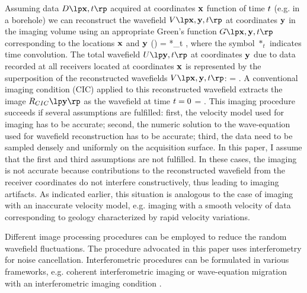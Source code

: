 Assuming data $\DD{\xm,\tm}$ acquired at coordinates ${\mathbf{x}}$ function of
time ${t}$ (e.g. in a borehole) we can reconstruct the wavefield
$\VV{\xm,\ym,\tm}$ at coordinates ${\mathbf{y}}$ in the imaging volume using an
appropriate Green's function $\GG{\xm,\ym,\tm}$ corresponding to the
locations ${\mathbf{x}}$ and ${\mathbf{y}}$ ()
%
\beq \label{eqn:green}
\VV{\xm,\ym,\tm} = \DD{\xm,\tm} *_t \GG{\xm,\ym,\tm} \;,
\eeq
%
where the symbol $*_t$ indicates time convolution.  The total
wavefield $\UU{\ym,\tm}$ at coordinates ${\mathbf{y}}$ due to data recorded at
all receivers located at coordinates ${\mathbf{x}}$ is represented by the
superposition of the reconstructed wavefields $\VV{\xm,\ym,\tm}$:
%
\beq \label{eqn:linear}
\UU{\ym,\tm} = \intxm \VV{\xm,\ym,\tm} \;.
\eeq
%
A conventional imaging condition (CIC) applied to this reconstructed
wavefield extracts the image $\IA{CIC}{\ym}$ as the wavefield at time
${t}=0$
%
\beq \label{eqn:cic}
 =  \;.
\eeq
%
This imaging procedure succeeds if several assumptions are fulfilled:
first, the velocity model used for imaging has to be accurate; second,
the numeric solution to the wave-equation used for wavefield
reconstruction has to be accurate; third, the data need to be sampled
densely and uniformly on the acquisition surface. In this paper, I
assume that the first and third assumptions are not fulfilled. In
these cases, the imaging is not accurate because contributions to the
reconstructed wavefield from the receiver coordinates do not interfere
constructively, thus leading to imaging artifacts. As indicated
earlier, this situation is analogous to the case of imaging with an
inaccurate velocity model, e.g. imaging with a smooth velocity of data
corresponding to geology characterized by rapid velocity variations.


Different image processing procedures can be employed to reduce the
random wavefield fluctuations. The procedure advocated in this paper
uses interferometry for noise cancellation. Interferometric procedures
can be formulated in various frameworks, e.g. coherent interferometric
imaging \cite[]{Borcea.GEO.2006} or wave-equation migration with an
interferometric imaging condition \cite[]{SavaPoliannikov.geo.iic}.


